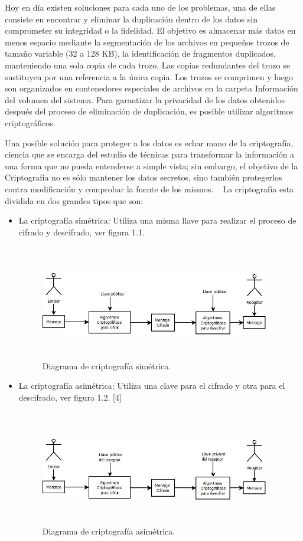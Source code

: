Hoy en día existen soluciones para cada uno de los problemas, una de ellas consiste en encontrar y eliminar la duplicación dentro de los datos sin comprometer su integridad o la fidelidad. El objetivo es almacenar más datos en menos espacio mediante la segmentación de los archivos en pequeños trozos de tamaño variable (32 a 128 KB), la identificación de fragmentos duplicados, manteniendo una sola copia de cada trozo. Las copias redundantes del trozo se sustituyen por una referencia a la única copia. Los trozos se comprimen y luego son organizados en contenedores especiales de archivos en la carpeta Información del volumen del sistema. Para garantizar la privacidad de los datos obtenidos después del proceso de eliminación de duplicación, es posible utilizar algoritmos criptográficos. ~\cite{microsoft}

Una posible solución para proteger a los datos es echar mano de la criptografía, ciencia que se encarga del estudio de técnicas para transformar la información a una forma que no pueda entenderse a simple vista; sin embargo, el objetivo de la Criptografía no es sólo mantener los datos secretos, sino también protegerlos contra modificación y comprobar la fuente de los mismos. ~\cite{fundamentos} La criptografía esta dividida en dos grandes tipos que son:

\begin{itemize}
	\item La criptografía simétrica: Utiliza una misma llave para realizar el proceso de cifrado y descifrado, ver figura 1.1.
		\begin{figure}[H]
			\centering
			\includegraphics[width=10cm, height=5cm]{./images/sim.jpeg}
			\caption{Diagrama de criptografía simétrica.}
		\end{figure}
	\item La criptografía asimétrica: Utiliza una clave para el cifrado y otra para el descifrado, ver figura 1.2. [4]
		\begin{figure}[H]
			\centering
			\includegraphics[width=10cm, height=5cm]{./images/asim.jpeg}
			\caption{Diagrama de criptografía asimétrica.}
		\end{figure}
\end{itemize}

